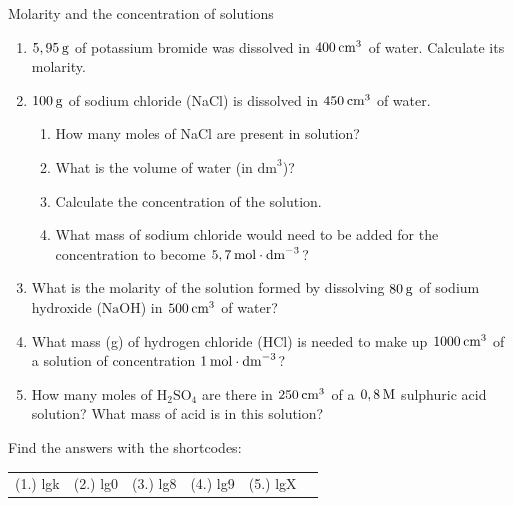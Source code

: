             \begin{exercises}{ Molarity and the concentration of solutions
      }
            \nopagebreak
      \label{m38712*id283713}\begin{enumerate}[noitemsep, label=\textbf{\arabic*}. ] 
            \label{m38712*uid92}\item $5,95\phantom{\rule{2pt}{0ex}}\mathrm{g}$ of potassium bromide was dissolved in $400\phantom{\rule{2pt}{0ex}}{\mathrm{cm}}^{3}$ of water. Calculate its molarity.\newline
\label{m38712*uid93}\item $100\phantom{\rule{2pt}{0ex}}\mathrm{g}$ of sodium chloride (NaCl) is dissolved in $450\phantom{\rule{2pt}{0ex}}{\mathrm{cm}}^{3}$ of water.
\label{m38712*id283768}\begin{enumerate}[noitemsep, label=\textbf{\alph*}. ] 
            \label{m38712*uid94}\item How many moles of NaCl are present in solution?
\label{m38712*uid95}\item What is the volume of water (in ${\mathrm{dm}}^{3}$)?
\label{m38712*uid96}\item Calculate the concentration of the solution.
\label{m38712*uid97}\item What mass of sodium chloride would need to be added for the concentration to become $5,7\phantom{\rule{2pt}{0ex}}\mathrm{mol}\ensuremath{\cdot}{\mathrm{dm}}^{-3}$?
\end{enumerate}
                \label{m38712*uid98}\item What is the molarity of the solution formed by dissolving $80\phantom{\rule{2pt}{0ex}}\mathrm{g}$ of sodium hydroxide ($\mathrm{NaOH}$) in $500\phantom{\rule{2pt}{0ex}}{\mathrm{cm}}^{3}$ of water?\newline
\label{m38712*uid99}\item What mass (g) of hydrogen chloride ($\mathrm{HCl}$) is needed to make up $1000\phantom{\rule{2pt}{0ex}}{\mathrm{cm}}^{3}$ of a solution of concentration $1\phantom{\rule{2pt}{0ex}}\mathrm{mol}\ensuremath{\cdot}{\mathrm{dm}}^{-3}$?\newline
\label{m38712*uid100}\item How many moles of $\mathrm{H}{}_{2}\mathrm{SO}{}_{4}$ are there in $250\phantom{\rule{2pt}{0ex}}{\mathrm{cm}}^{3}$ of a $0,8\phantom{\rule{2pt}{0ex}}\mathrm{M}$ sulphuric acid solution? What mass of acid is in this solution?\newline
\end{enumerate}
    \label{m38712*cid9}
\par {} Find the answers with the shortcodes:
 \par \begin{tabular}[h]{cccccc}
 (1.) lgk  &  (2.) lg0  &  (3.) lg8  &  (4.) lg9  &  (5.) lgX  & \end{tabular}
\end{exercises}

